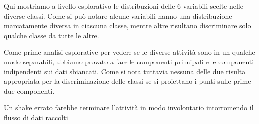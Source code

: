 %
Qui mostriamo a livello esplorativo le distribuzioni delle 6 variabili scelte nelle diverse classi. Come si può notare alcune variabili hanno una distribuzione marcatamente diversa in ciascuna classe, mentre altre risultano discriminare solo qualche classe da tutte le altre.
%

%
Come prime analisi esplorative per vedere se le diverse attività sono in un qualche modo separabili, abbiamo provato a fare le componenti principali e le componenti indipendenti sui dati sbiancati. Come si nota tuttavia nessuna delle due risulta appropriata per la discriminazione delle classi se si proiettano i punti sulle prime due componenti.




%
Un shake errato farebbe terminare l\rq{}attività in modo involontario intorromendo il flusso di dati raccolti